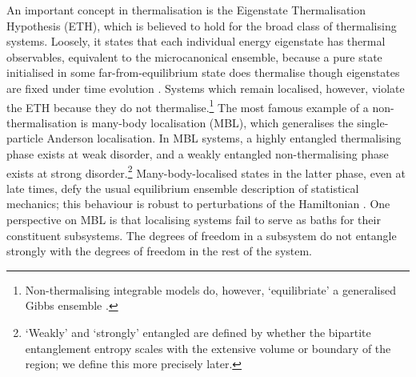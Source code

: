 \documentclass[10pt]{article}
\begin{document}
An important concept in thermalisation is the Eigenstate Thermalisation Hypothesis (ETH), which is believed to hold for the broad class of thermalising systems. Loosely, it states that each individual energy eigenstate has thermal observables, equivalent to the microcanonical ensemble, because a pure state initialised in some far-from-equilibrium state does thermalise though eigenstates are fixed under time evolution \cite{abanin2019colloquium, nandkishore2015many}. Systems which remain localised, however, violate the ETH because they do not thermalise.\footnote{Non-thermalising integrable models do, however, `equilibriate' a generalised Gibbs ensemble \cite{ilievski2015complete, calabrese2007quantum}.} The most famous example of a non-thermalisation is many-body localisation (MBL), which generalises the single-particle Anderson localisation. In MBL systems, a highly entangled thermalising phase exists at weak disorder, and a weakly entangled non-thermalising phase exists at strong disorder.\footnote{`Weakly' and `strongly' entangled are defined by whether the bipartite entanglement entropy scales with the extensive volume or boundary of the region; we define this more precisely later.} Many-body-localised states in the latter phase, even at late times, defy the usual equilibrium ensemble description of statistical mechanics; this behaviour is robust to perturbations of the Hamiltonian \cite{nandkishore2015many}. One perspective on MBL is that localising systems fail to serve as baths for their constituent subsystems. The degrees of freedom in a subsystem do not entangle strongly with the degrees of freedom in the rest of the system. 


\end{document}
